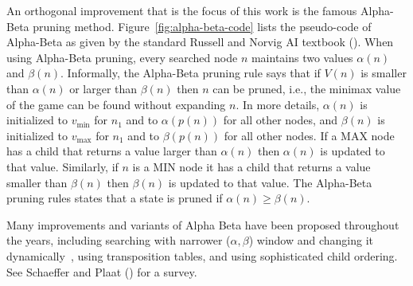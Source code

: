 \documentclass[runningheads]{llncs}
\newcommand{\MM}{\mathit{V}}
\newcommand{\vmax}{v_{\text{max}}}
\newcommand{\vmin}{v_{\text{min}}}
\newcommand{\rootnode}{\mathit{n_1}}
\begin{document}
An orthogonal improvement that is the focus of this work is the famous Alpha-Beta pruning method. 
Figure~\ref{fig:alpha-beta-code} lists the pseudo-code of Alpha-Beta as given by the standard Russell and Norvig AI textbook (\citeyear{russell2016artificial}). 
When using Alpha-Beta pruning, every searched node $n$ maintains two values $\alpha(n)$ and $\beta(n)$. 
Informally, the Alpha-Beta pruning rule says that if $\MM(n)$ is smaller than $\alpha(n)$ or larger than $\beta(n)$ then $n$ can be pruned, i.e., the minimax value of the game can be found without expanding $n$. In more details,  
$\alpha(n)$ is initialized to $\vmin$ for $\rootnode{}$ and to $\alpha(p(n))$ for all other nodes, and $\beta(n)$ is initialized to $\vmax$ for $\rootnode{}$ and to $\beta(p(n))$ for all other nodes. If a MAX node has a child that returns a value larger than $\alpha(n)$ then $\alpha(n)$ is updated to that value. Similarly, if $n$ is a MIN node it has a child that returns a value smaller than $\beta(n)$ then $\beta(n)$ is updated to that value. The Alpha-Beta pruning rules states that a state is pruned if $\alpha(n)\geq \beta(n)$.


Many improvements and variants of Alpha Beta have been proposed throughout the years, including searching with narrower ($\alpha, \beta$) window and changing it dynamically~\citep{pearl1980scout,reinefeld1983improvement}, using transposition tables, and using sophisticated child ordering. See
Schaeffer and Plaat (\citeyear{schaeffer1996new}) for a survey. 




\end{document}
